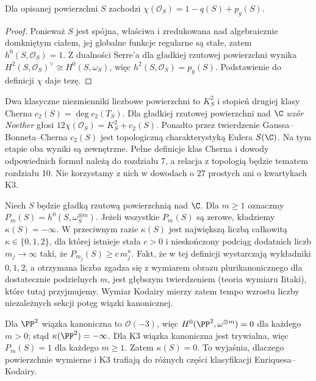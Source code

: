 \begin{stwierdzenie}
\label{st:ga6-chi}
Dla opisanej powierzchni $S$ zachodzi
$\chi(\mathcal O_S)=1-q(S)+p_g(S)$.
\end{stwierdzenie}
\begin{proof}
Ponieważ $S$ jest spójna, właściwa i zredukowana
nad algebraicznie domkniętym ciałem, jej globalne
funkcje regularne są stałe, zatem
$h^0(S,\mathcal O_S)=1$. Z dualności Serre'a
dla gładkiej rzutowej powierzchni wynika
$H^2(S,\mathcal O_S)^\vee\cong H^0(S,\omega_S)$,
więc $h^2(S,\mathcal O_S)=p_g(S)$.
Podstawienie do definicji $\chi$ daje tezę.
\end{proof}

\begin{uwaga}
Dwa klasyczne niezmienniki liczbowe powierzchni
to $K_S^2$ i stopień drugiej klasy Cherna
$c_2(S)=\deg c_2(T_S)$. Dla gładkiej rzutowej
powierzchni nad $\C$ \emph{wzór Noether} głosi
$12\chi(\mathcal O_S)=K_S^2+c_2(S)$.
Ponadto przez twierdzenie Gaussa--Bonneta--Cherna
$c_2(S)$ jest topologiczną charakterystyką Eulera
$S(\C)$. Na tym etapie oba wyniki są zewnętrzne.
Pełne definicje klas Cherna i dowody odpowiednich
formuł należą do rozdziału 7, a relacja z topologią
będzie tematem rozdziału 10. Nie korzystamy z nich
w dowodach o $27$ prostych ani o kwartykach K3.
\end{uwaga}

\begin{definicja}
Niech $S$ będzie gładką rzutową powierzchnią nad $\C$.
Dla $m\ge1$ oznaczmy
$P_m(S)=h^0(S,\omega_S^{\otimes m})$.
Jeżeli wszystkie $P_m(S)$ są zerowe, kładziemy
$\kappa(S)=-\infty$. W przeciwnym razie
$\kappa(S)$ jest największą liczbą całkowitą
$\kappa\in\{0,1,2\}$, dla której istnieje stała
$c>0$ i nieskończony podciąg dodatnich liczb
$m_j\to\infty$ taki, że
$P_{m_j}(S)\ge c\,m_j^{\kappa}$.
Fakt, że w tej definicji wystarczają wykładniki
$0,1,2$, a otrzymana liczba zgadza się z wymiarem obrazu
plurikanonicznego dla dostatecznie podzielnych $m$,
jest głębszym twierdzeniem (teoria wymiaru Iitaki),
które tutaj przyjmujemy.
Wymiar Kodairy mierzy zatem tempo wzrostu
liczby niezależnych sekcji potęg wiązki kanonicznej.
\end{definicja}

\begin{przyklad}
Dla $\PP^2$ wiązka kanoniczna to $\mathcal O(-3)$,
więc $H^0(\PP^2,\omega^{\otimes m})=0$
dla każdego $m>0$; stąd $\kappa(\PP^2)=-\infty$.
Dla K3 wiązka kanoniczna jest trywialna,
więc $P_m(S)=1$ dla każdego $m\ge1$.
Zatem $\kappa(S)=0$. To wyjaśnia, dlaczego
powierzchnie wymierne i K3 trafiają do różnych
części klasyfikacji Enriquesa--Kodairy.
\end{przyklad}

